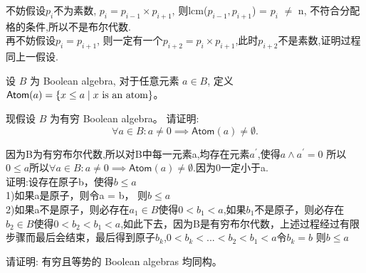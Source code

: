 \documentclass[a4paper, justified]{tufte-handout}
\begin{document}
\begin{solution}
  不妨假设$p_i$不为素数, $p_i = p_{i - 1} \times p_{i + 1}$, 则lcm($p_{i - 1}, p_{i + 1}$) = $p_i$ $\neq$ n, 不符合分配格的条件,所以不是布尔代数.\\
  再不妨假设$p_i = p_{i + 1}$, 则一定有一个$p_{i + 2} = p_i \times p_{i + 1}$,此时$p_{i + 2}$不是素数,证明过程同上一假设.
\end{solution}

\begin{problem}[Atom]
设 $B$ 为 Boolean algebra, 对于任意元素 $a \in B$,
定义 $\textsf{Atom}(a) = \{x \le a \mid x \text{ is an atom}\}$。

\noindent 现假设 $B$ 为有穷 Boolean algebra。
请证明:
\[
  \forall a \in B: a \neq 0 \implies \textsf{Atom}(a) \neq \emptyset.
\]
\end{problem}

\begin{solution}
  因为B为有穷布尔代数,所以对B中每一元素a,均存在元素$a^{'}$,使得$a \land a^{'} = 0$ 所以$0 \leqslant a$所以$\forall a \in B: a \neq 0 \implies \textsf{Atom}(a) \neq \emptyset.$因为0一定小于a.\\
  证明:设存在原子b，使得$b \leqslant a$\\
  1)如果a是原子，则令a = b， 则$b \leqslant a$\\
  2)如果a不是原子，则必存在$a_1 \in B$使得$0 < b_1 < a$,如果$b_1$不是原子，则必存在$b_2 \in B$使得$0 < b_2 < b_1 < a$,如此下去，因为B是有穷布尔代数，上述过程经过有限步骤而最后会结束，最后得到原子$b_k$,$0 < b_k < ... <b_2 < b_1 < a$令$b_k = b$ 则$b \leqslant a$
\end{solution}

\begin{problem}[Isomorphic]
请证明: 有穷且等势的 Boolean algebras 均同构。
\end{problem}
\end{document}

